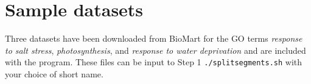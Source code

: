 \documentclass[12pt,letterpaper]{report}
\begin{document}
\section*{\large Sample datasets}
Three datasets have been downloaded from BioMart for the GO terms \textit{response to salt stress}, \textit{photosynthesis}, and \textit{response to water deprivation} and are included with the program. These files can be input to Step 1 \texttt{./splitsegments.sh} with your choice of short name.



\end{document}
